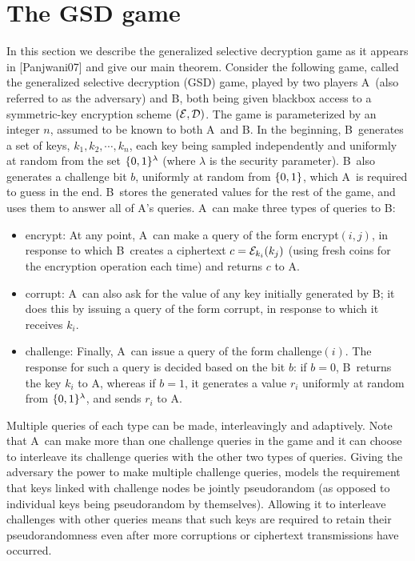\documentclass{article}
\def\B{{\sf B}}
\def\A{{\sf A}}
\def\E{{\cal E}}
\def\D{{\cal D}}
\newcommand{\encrypt}{{\sf encrypt}}
\def\corrupt{{\sf corrupt}}
\def\challenge{{\sf challenge}}
\begin{document}
\section{The GSD game}
In this section we describe the generalized selective decryption game as it appears in [Panjwani07] and give our main theorem. \iffalse which improves on the result of previous work in many cases... \fi  Consider the following game, called the generalized selective decryption
(GSD) game, played by two players \A~(also referred to as the adversary) and \B, both being given blackbox access to a symmetric-key encryption scheme $(\E,\D)$. The game is parameterized by an integer $n$, assumed to be known to both \A~and \B. In the beginning, \B~generates a set of keys, $k_1, k_2, \cdots, k_n$, each key being sampled independently and uniformly at random from the set $\{0,1\}^\lambda$ (where $\lambda$ is the security parameter). \B~also generates a challenge bit $b $, uniformly at random from $\{0,1\}$, which \A~is required to guess in the end. \B~stores the generated values for the rest of the game, and uses them to answer all of \A's queries. \A~can make three types of queries to \B:
\begin{itemize}
\item \encrypt: At any point, \A~can make a query of the form \encrypt$(i, j)$, in
response to which \B~creates a ciphertext $c=\E_{k_i} (k_j)$ (using fresh coins for the encryption operation each time) and returns $c$ to \A.
\item \corrupt: \A~can also ask for the value of any key initially generated by \B; it does this by issuing a query of the form \corrupt, in response to which it receives $k_i$.
\item \challenge: Finally, \A~can issue a query of the form \challenge$(i)$. The response for such a query is decided based on the bit $b$: if $b = 0$, \B~returns the key $k_i$ to \A, whereas if $b = 1$, it generates a value $r_i$ uniformly at random
from $\{0,1\}^\lambda$, and sends $r_i$ to \A.
\end{itemize}
Multiple queries of each type can be made, interleavingly and adaptively. Note that \A~can make more than one challenge queries in the game and it can choose to interleave
its challenge queries with the other two types of queries. Giving the adversary the power to make multiple
challenge queries, models the requirement that keys linked with challenge nodes be jointly     
pseudorandom (as opposed to individual keys being pseudorandom by themselves). Allowing it
to interleave challenges with other queries means that such keys are required to retain their
pseudorandomness even after more corruptions or ciphertext transmissions have occurred.
\end{document}
